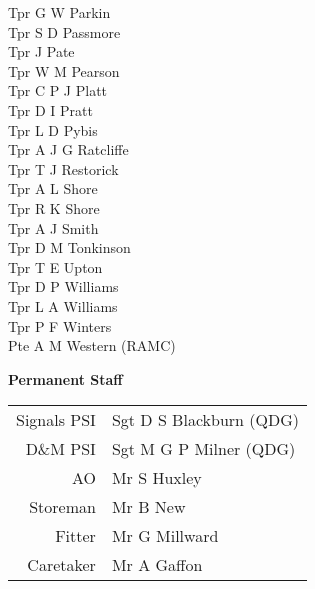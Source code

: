 \begin{multicols}{2}
  Tpr G W Parkin \\
  Tpr S D Passmore \\
  Tpr J Pate \\
  Tpr W M Pearson \\
  Tpr C P J Platt \\
  Tpr D I Pratt \\
  Tpr L D Pybis \\
  Tpr A J G Ratcliffe \\
  Tpr T J Restorick \\
  Tpr A L Shore \\
  Tpr R K Shore \\
  Tpr A J Smith \\
  Tpr D M Tonkinson \\
  Tpr T E Upton \\
  Tpr D P Williams \\
  Tpr L A Williams \\
  Tpr P F Winters \\
  Pte A M Western (RAMC) \\
\end{multicols}

\begin{center}
  \Large
  \textbf{Permanent Staff}
\end{center}

\begin{center}
  \begin{tabular}{rl}
    Signals PSI & Sgt D S Blackburn (QDG) \\
    D\&M PSI & Sgt M G P Milner (QDG) \\
    AO & Mr S Huxley \\
    Storeman & Mr B New \\
    Fitter & Mr G Millward \\
    Caretaker & Mr A Gaffon \\
  \end{tabular}
\end{center}

